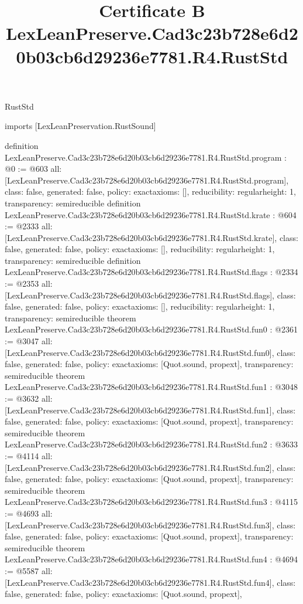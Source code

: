 \begin{lexlean}{RustStd}
\title{Certificate B LexLeanPreserve.Cad3c23b728e6d20b03cb6d29236e7781.R4.RustStd}
\begin{coremodule}
imports [LexLeanPreservation.RustSound]

definition LexLeanPreserve.Cad3c23b728e6d20b03cb6d29236e7781.R4.RustStd.program : @0 := @603 {
  all: [LexLeanPreserve.Cad3c23b728e6d20b03cb6d29236e7781.R4.RustStd.program],
  class: false,
  generated: false,
  policy: exact{axioms: []},
  reducibility: regular{height: 1},
  transparency: semireducible
}
definition LexLeanPreserve.Cad3c23b728e6d20b03cb6d29236e7781.R4.RustStd.krate : @604 := @2333 {
  all: [LexLeanPreserve.Cad3c23b728e6d20b03cb6d29236e7781.R4.RustStd.krate],
  class: false,
  generated: false,
  policy: exact{axioms: []},
  reducibility: regular{height: 1},
  transparency: semireducible
}
definition LexLeanPreserve.Cad3c23b728e6d20b03cb6d29236e7781.R4.RustStd.flags : @2334 := @2353 {
  all: [LexLeanPreserve.Cad3c23b728e6d20b03cb6d29236e7781.R4.RustStd.flags],
  class: false,
  generated: false,
  policy: exact{axioms: []},
  reducibility: regular{height: 1},
  transparency: semireducible
}
theorem LexLeanPreserve.Cad3c23b728e6d20b03cb6d29236e7781.R4.RustStd.fun0 : @2361 := @3047 {
  all: [LexLeanPreserve.Cad3c23b728e6d20b03cb6d29236e7781.R4.RustStd.fun0],
  class: false,
  generated: false,
  policy: exact{axioms: [Quot.sound, propext]},
  transparency: semireducible
}
theorem LexLeanPreserve.Cad3c23b728e6d20b03cb6d29236e7781.R4.RustStd.fun1 : @3048 := @3632 {
  all: [LexLeanPreserve.Cad3c23b728e6d20b03cb6d29236e7781.R4.RustStd.fun1],
  class: false,
  generated: false,
  policy: exact{axioms: [Quot.sound, propext]},
  transparency: semireducible
}
theorem LexLeanPreserve.Cad3c23b728e6d20b03cb6d29236e7781.R4.RustStd.fun2 : @3633 := @4114 {
  all: [LexLeanPreserve.Cad3c23b728e6d20b03cb6d29236e7781.R4.RustStd.fun2],
  class: false,
  generated: false,
  policy: exact{axioms: [Quot.sound, propext]},
  transparency: semireducible
}
theorem LexLeanPreserve.Cad3c23b728e6d20b03cb6d29236e7781.R4.RustStd.fun3 : @4115 := @4693 {
  all: [LexLeanPreserve.Cad3c23b728e6d20b03cb6d29236e7781.R4.RustStd.fun3],
  class: false,
  generated: false,
  policy: exact{axioms: [Quot.sound, propext]},
  transparency: semireducible
}
theorem LexLeanPreserve.Cad3c23b728e6d20b03cb6d29236e7781.R4.RustStd.fun4 : @4694 := @5587 {
  all: [LexLeanPreserve.Cad3c23b728e6d20b03cb6d29236e7781.R4.RustStd.fun4],
  class: false,
  generated: false,
  policy: exact{axioms: [Quot.sound, propext]},
}
\end{coremodule}
\end{lexlean}
